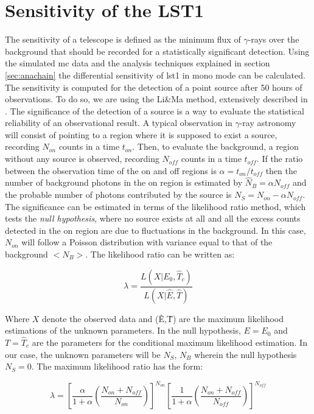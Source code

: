 \documentclass[main.tex]{subfiles}
\begin{document}
\section{Sensitivity of the LST1} \label{sec:sensitivity}

The sensitivity of a telescope is defined as the minimum flux of $\gamma$-rays over the background that should be recorded for a statistically significant detection. Using the simulated \gls{mc} data and the analysis techniques explained in section \ref{sec:anachain} the differential sensitivity of \gls{lst}1 in mono mode can be calculated.
The sensitivity is computed for the detection of a point source after 50 hours of observations. To do so, we are using the Li\&Ma method, extensively described in \cite{1983LiMa}. The significance of the detection of a source is a way to evaluate the statistical reliability of an observational result. A typical observation in $\gamma$-ray astronomy will consist of pointing to a region where it is supposed to exist a source, recording $N_{on}$ counts in a time $t_{on}$. Then, to evaluate the background, a region without any source is observed, recording $N_{off}$ counts in a time $t_{off}$. If the ratio between the observation time of the on and off regions is $\alpha = t_{on}/t_{off}$ then the number of background photons in the on region is estimated by $\hat{N}_{B} = \alpha N_{off}$  and the probable number of photons contributed by the source is $N_{S} = N_{on}-\alpha N_{off}$. The significance can be estimated in terms of the likelihood ratio method, which tests the \textit{null hypothesis}, where no source exists at all and all the excess counts detected in the on region are due to fluctuations in the background. In this case, $N_{on}$ will follow a Poisson distribution with variance equal to that of the background $<N_{B}>$. The likelihood ratio can be written as:

\begin{equation}
  \lambda = \frac{L(X | E_{0}, \hat{T}_{c})}{L(X|\hat{E},\hat{T})}
\end{equation}

Where $X$ denote the observed data and (\^{E},\^{T}) are the maximum likelihood estimations of the unknown parameters. In the null hypothesis, $E=E_{0}$ and $T=\hat{T}_{c}$ are the parameters for the conditional maximum likelihood estimation. In our case, the unknown parameters will be $N_{S}$, $N_{B}$ wherein the null hypothesis $N_{S}=0$.
The maximum likelihood ratio has the form:

\begin{equation}
  \lambda = \left[ \frac{\alpha}{1+\alpha}\left( \frac{N_{on}+N_{off}}{N_{on}}\right) \right]^{N_{on}} \left[ \frac{1}{1+\alpha}\left( \frac{N_{on}+N_{off}}{N_{off}}\right)\right]^{N_{off}}
\end{equation}
\end{document}
